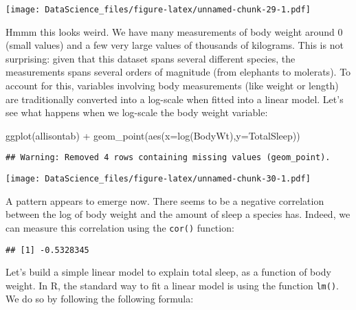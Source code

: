 \documentclass[
]{book}
\newenvironment{Shaded}{\begin{snugshade}}{\end{snugshade}}
\newcommand{\AttributeTok}[1]{\textcolor[rgb]{0.77,0.63,0.00}{#1}}
\newcommand{\FunctionTok}[1]{\textcolor[rgb]{0.00,0.00,0.00}{#1}}
\newcommand{\NormalTok}[1]{#1}
\newcommand{\SpecialCharTok}[1]{\textcolor[rgb]{0.00,0.00,0.00}{#1}}
\newcommand{\StringTok}[1]{\textcolor[rgb]{0.31,0.60,0.02}{#1}}
\begin{document}
\texttt{[image: DataScience\_files/figure-latex/unnamed-chunk-29-1.pdf]}

Hmmm this looks weird. We have many measurements of body weight around 0 (small values) and a few very large values of thousands of kilograms. This is not surprising: given that this dataset spans several different species, the measurements spans several orders of magnitude (from elephants to molerats). To account for this, variables involving body measurements (like weight or length) are traditionally converted into a log-scale when fitted into a linear model. Let's see what happens when we log-scale the body weight variable:

\begin{Shaded}
\begin{Highlighting}[]
\FunctionTok{ggplot}\NormalTok{(allisontab) }\SpecialCharTok{+} \FunctionTok{geom\_point}\NormalTok{(}\FunctionTok{aes}\NormalTok{(}\AttributeTok{x=}\FunctionTok{log}\NormalTok{(BodyWt),}\AttributeTok{y=}\NormalTok{TotalSleep))}
\end{Highlighting}
\end{Shaded}

\begin{verbatim}
## Warning: Removed 4 rows containing missing values (geom_point).
\end{verbatim}

\texttt{[image: DataScience\_files/figure-latex/unnamed-chunk-30-1.pdf]}

A pattern appears to emerge now. There seems to be a negative correlation between the log of body weight and the amount of sleep a species has. Indeed, we can measure this correlation using the \texttt{cor()} function:

\begin{Shaded}
\end{Shaded}

\begin{verbatim}
## [1] -0.5328345
\end{verbatim}

Let's build a simple linear model to explain total sleep, as a function of body weight. In R, the standard way to fit a linear model is using the function \texttt{lm()}. We do so by following the following formula:
\end{document}
